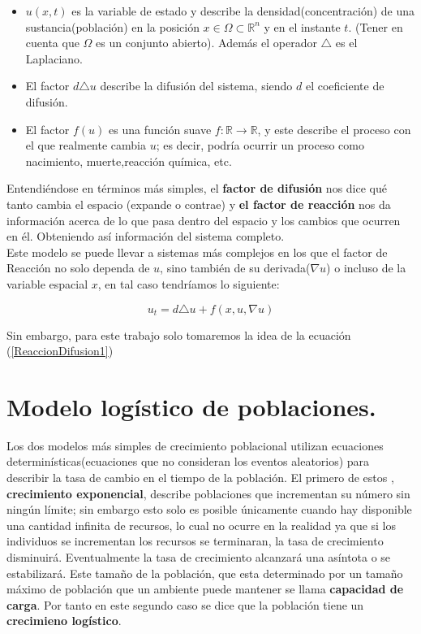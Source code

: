 \begin{itemize}
	\item $u(x,t)$ es la variable de estado y describe la densidad(concentración) de una sustancia(población) en la posición $ x\in \Omega\subset { \mathbb{R} }^{ n }$ y en el instante $t $. (Tener en cuenta que $\Omega$ es un conjunto abierto). Además el operador $ \triangle $ es el Laplaciano.
	\item El factor $d\triangle u $ describe la difusión del sistema, siendo $d$ el coeficiente de difusión.
	\item El factor $f(u)$ es una función suave $f:\mathbb{R}\rightarrow \mathbb{R} $, y este describe el proceso con el que realmente cambia $u$; es decir, podría ocurrir un proceso como nacimiento, muerte,reacción química, etc.
\end{itemize}

Entendiéndose en términos más simples, el \textbf{factor de difusión} nos dice qué tanto cambia el espacio (expande o contrae) y \textbf{el factor de reacción} nos da información acerca de lo que pasa dentro del espacio y los cambios que ocurren en él. Obteniendo así información del sistema completo.\\

Este modelo se puede llevar a sistemas más complejos en los que el factor de Reacción no solo dependa de $u$, sino también de su derivada($ \nabla u$) o incluso de la variable espacial $x$, en tal caso tendríamos lo siguiente:

\begin{equation}
	\label{ReaccionDifusion2}
	 u_{ t }=d\triangle u + f(x,u,\nabla u)
\end{equation}

\vspace{0.2cm}
Sin embargo, para este trabajo solo tomaremos la idea de la ecuación (\ref{ReaccionDifusion1})
\section{Modelo logístico de poblaciones.}\label{cap:mod log pob}
Los dos modelos más simples de crecimiento poblacional utilizan ecuaciones determinísticas(ecuaciones que no consideran los eventos aleatorios) para describir la tasa de cambio en el tiempo de la población. El primero de estos , \textbf{crecimiento exponencial}, describe poblaciones que incrementan su número sin ningún límite; sin embargo esto solo es posible  únicamente cuando hay disponible una cantidad infinita de recursos, lo cual no ocurre en la realidad ya que si los individuos se incrementan los recursos se terminaran, la tasa de crecimiento disminuirá. Eventualmente la tasa de crecimiento alcanzará una asíntota o se estabilizará. Este tamaño de la población, que esta determinado por un tamaño máximo de población que un ambiente puede mantener se llama \textbf{capacidad de carga}. Por tanto en este segundo caso se dice que la población tiene un \textbf{crecimieno logístico}. 

